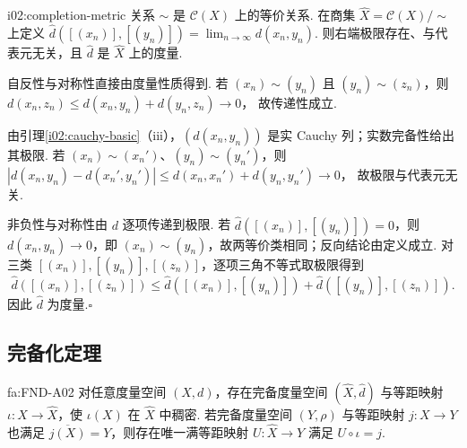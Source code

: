\begin{FALemma}{i02:completion-metric}
关系 \(\displaystyle \sim\) 是 \(\displaystyle \mathcal C(X)\) 上的等价关系. 在商集 \(\displaystyle \widehat X=\mathcal C(X)/{\sim}\) 上定义 \(\displaystyle \widehat d([(x_n)],[(y_n)])=\lim_{n\to\infty}d(x_n,y_n)\).
则右端极限存在、与代表元无关，且 \(\displaystyle \widehat d\) 是 \(\displaystyle \widehat X\) 上的度量.
\end{FALemma}

\begin{FAProof}
自反性与对称性直接由度量性质得到. 若 \(\displaystyle (x_n)\sim(y_n)\) 且 \(\displaystyle (y_n)\sim(z_n)\)，则 \(\displaystyle d(x_n,z_n)\leqslant d(x_n,y_n)+d(y_n,z_n)\longrightarrow0\)，
故传递性成立.

由引理\ref{i02:cauchy-basic}（iii），\(\displaystyle (d(x_n,y_n))\) 是实 Cauchy 列；实数完备性给出其极限. 若 \(\displaystyle (x_n)\sim(x_n')\)、\(\displaystyle (y_n)\sim(y_n')\)，则 \(\displaystyle |d(x_n,y_n)-d(x_n',y_n')| \leqslant d(x_n,x_n')+d(y_n,y_n')\longrightarrow0\)，
故极限与代表元无关.

非负性与对称性由 \(\displaystyle d\) 逐项传递到极限. 若 \(\displaystyle \widehat d([(x_n)],[(y_n)])=0\)，则 \(\displaystyle d(x_n,y_n)\to0\)，即 \(\displaystyle (x_n)\sim(y_n)\)，故两等价类相同；反向结论由定义成立. 对三类 \(\displaystyle [(x_n)],[(y_n)],[(z_n)]\)，逐项三角不等式取极限得到
\[
\widehat d([(x_n)],[(z_n)])
\leqslant \widehat d([(x_n)],[(y_n)])+\widehat d([(y_n)],[(z_n)]).
\]
因此 \(\displaystyle \widehat d\) 为度量.\hfill\(\square\)
\end{FAProof}

\subsection{完备化定理}

\begin{FATheorem}[A][完备化定理]{fa:FND-A02}
对任意度量空间 \(\displaystyle (X,d)\)，存在完备度量空间 \(\displaystyle (\widehat X,\widehat d)\) 与等距映射 \(\displaystyle \iota:X\to\widehat X\)，使 \(\displaystyle \iota(X)\) 在 \(\displaystyle \widehat X\) 中稠密. 若完备度量空间 \(\displaystyle (Y,\rho)\) 与等距映射 \(\displaystyle j:X\to Y\) 也满足 \(\displaystyle \overline{j(X)}=Y\)，则存在唯一满等距映射 \(\displaystyle U:\widehat X\to Y\) 满足 \(\displaystyle U\circ\iota=j\).
\end{FATheorem}

